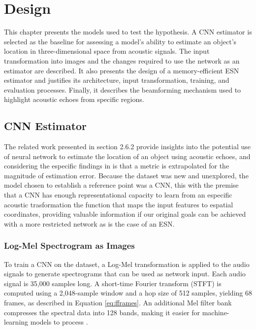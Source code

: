 \chapter{Design}
\label{chapter:design}
\newpage

This chapter presents the models used to test the hypothesis. A CNN estimator is selected as the baseline for assessing a model's ability to estimate an object's location in three-dimensional space from acoustic signals. The input transformation into images and the changes required to use the network as an estimator are described. It also presents the design of a memory-efficient ESN estimator and justifies its architecture, input transformation, training, and evaluation processes. Finally, it describes the beamforming mechanism used to highlight acoustic echoes from specific regions.

\section{CNN Estimator}

The related work presented in section 2.6.2 provide insights into the potential use of neural network to estimate the location of an object using acoustic echoes, and considering the especific findings in \cite{echosense} is that a metric is extrapolated for the magnitude of estimation error. Because the dataset was new and unexplored, the model chosen to establish a reference point was a CNN, this with the premise that a CNN has enough representational capacity to learn from an especific acoustic trasformation the function that maps the input features to espatial coordinates, providing valuable information if our original goals can be achieved with a more restricted network as is the case of an ESN.

\subsection{Log-Mel Spectrogram as Images}

To train a CNN on the dataset, a Log-Mel transformation is applied to the audio signals to generate spectrograms that can be used as network input. Each audio signal is 35,000 samples long. A short-time Fourier transform (STFT) is computed using a 2,048-sample window and a hop size of 512 samples, yielding 68 frames, as described in Equation \ref{eq:fframes}. An additional Mel filter bank compresses the spectral data into 128 bands, making it easier for machine-learning models to process \cite{log_mel_convolutional}.

